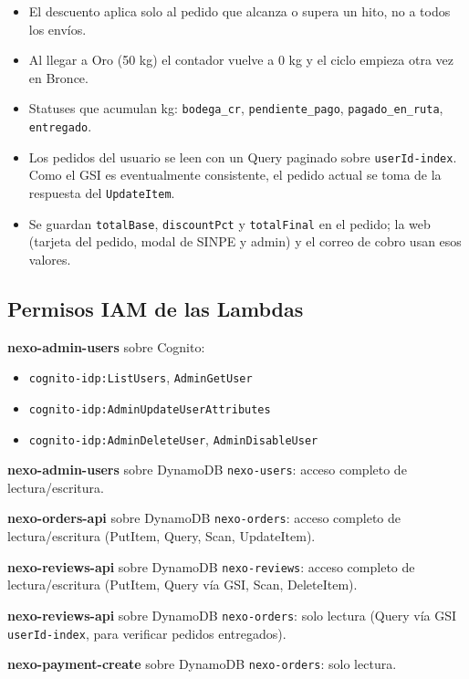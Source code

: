 \documentclass[12pt,a4paper]{article}
\begin{document}
\begin{itemize}
  \item El descuento aplica solo al pedido que alcanza o supera un hito, no a todos los envíos.
  \item Al llegar a Oro (50 kg) el contador vuelve a 0 kg y el ciclo empieza otra vez en Bronce.
  \item Statuses que acumulan kg: \texttt{bodega\_cr}, \texttt{pendiente\_pago}, \texttt{pagado\_en\_ruta}, \texttt{entregado}.
  \item Los pedidos del usuario se leen con un Query paginado sobre \texttt{userId-index}. Como el GSI es
        eventualmente consistente, el pedido actual se toma de la respuesta del \texttt{UpdateItem}.
  \item Se guardan \texttt{totalBase}, \texttt{discountPct} y \texttt{totalFinal} en el pedido; la web
        (tarjeta del pedido, modal de SINPE y admin) y el correo de cobro usan esos valores.
\end{itemize}

\subsection{Permisos IAM de las Lambdas}

\textbf{nexo-admin-users} sobre Cognito:
\begin{itemize}
  \item \texttt{cognito-idp:ListUsers}, \texttt{AdminGetUser}
  \item \texttt{cognito-idp:AdminUpdateUserAttributes}
  \item \texttt{cognito-idp:AdminDeleteUser}, \texttt{AdminDisableUser}
\end{itemize}

\textbf{nexo-admin-users} sobre DynamoDB \texttt{nexo-users}: acceso completo de lectura/escritura.

\textbf{nexo-orders-api} sobre DynamoDB \texttt{nexo-orders}: acceso completo de lectura/escritura (PutItem, Query, Scan, UpdateItem).

\textbf{nexo-reviews-api} sobre DynamoDB \texttt{nexo-reviews}: acceso completo de lectura/escritura (PutItem, Query vía GSI, Scan, DeleteItem).

\textbf{nexo-reviews-api} sobre DynamoDB \texttt{nexo-orders}: solo lectura (Query vía GSI \texttt{userId-index}, para verificar pedidos entregados).

\textbf{nexo-payment-create} sobre DynamoDB \texttt{nexo-orders}: solo lectura.
\end{document}
